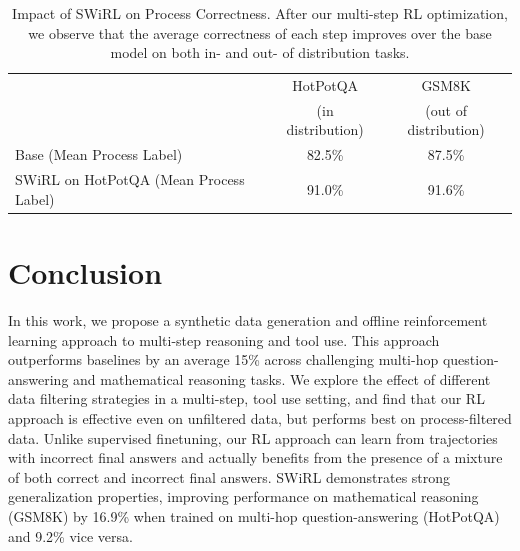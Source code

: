 \documentclass{article} %
\begin{document}
\begin{table}[htbp]
  \centering
  \label{tab:prm_accuracy} %
  \begin{tabular}{lcc}
    \toprule
     & HotPotQA & GSM8K \\
    & (in distribution) & (out of distribution) \\
    \midrule
    Base (Mean Process Label)      & 82.5\% & 87.5\% \\
    SWiRL on HotPotQA (Mean Process Label) & 91.0\% & 91.6\% \\

    \bottomrule
  \end{tabular}
  \caption{Impact of SWiRL on Process Correctness. After our multi-step RL optimization, we observe that the average correctness of each step improves over the base model on both in- and out- of distribution tasks.}
\end{table}
\vspace{-.2in}
\section{Conclusion} 
\vspace{-.1in}
In this work, we propose a synthetic data generation and offline reinforcement learning approach to multi-step reasoning and tool use. This approach outperforms baselines by an average 15\% across challenging multi-hop question-answering and mathematical reasoning tasks. We explore the effect of different data filtering strategies in a multi-step, tool use setting, and find that our RL approach is effective even on unfiltered data, but performs best on process-filtered data. Unlike supervised finetuning, our RL approach can learn from trajectories with incorrect final answers and actually benefits from the presence of a mixture of both correct and incorrect final answers. SWiRL demonstrates strong generalization properties, improving performance on mathematical reasoning (GSM8K) by 16.9\% when trained on multi-hop question-answering (HotPotQA) and 9.2\% vice versa.



\appendix



\renewcommand{\arraystretch}{1.4} %

\newpage
\end{document}
